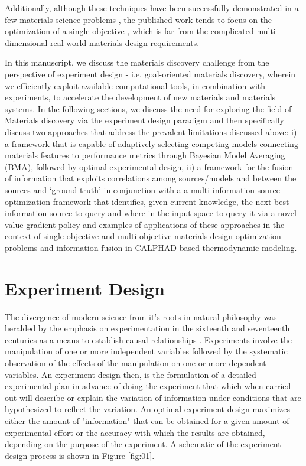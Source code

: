 \documentclass[utf8]{frontiersSCNS} %
\begin{document}
 Additionally, although these techniques have been successfully demonstrated in a few materials science problems \cite{MP1,MP2,MP3,MP4,MP5,MP6,MP7,MP8,MP9}, the published work tends to focus on the optimization of a single objective \cite{balachandran2016adaptive}, which is far from the complicated multi-dimensional real world materials design requirements.

In this manuscript, we discuss the materials discovery challenge from the perspective of experiment design - i.e. goal-oriented materials discovery, wherein we efficiently exploit available computational tools, in combination with experiments, to accelerate the development of new materials and materials systems. In the following sections, we discuss the need for exploring the field of Materials discovery via the experiment design paradigm and then  specifically discuss two approaches that address the prevalent limitations discussed above: i) a framework that is capable of adaptively selecting competing models connecting materials features to performance metrics through Bayesian Model Averaging (BMA), followed by optimal experimental design, ii) a framework for the fusion of information that exploits correlations among sources/models and between the sources and ‘ground truth’ in conjunction with a a multi-information source optimization framework that identifies, given current knowledge, the next best information source to query and where in the input space to query it via a novel value-gradient policy and examples of applications of these approaches in the context of single-objective and multi-objective materials design optimization problems  and information fusion in CALPHAD-based thermodynamic modeling. 

\section{Experiment Design}
 The divergence of modern science from it's roots in natural philosophy was heralded by the emphasis on experimentation in the sixteenth and seventeenth centuries as a means to establish causal relationships \cite{hacking1983representing}. Experiments involve the manipulation of one or more independent variables followed by the systematic observation of the effects of the manipulation on one or more dependent variables. An experiment design then, is the formulation of a detailed experimental plan in advance of doing the experiment that which when carried out will describe or explain the variation of information under conditions that are hypothesized to reflect the variation. An optimal experiment design maximizes either the amount of "information" that can be obtained for a given amount of experimental effort or the accuracy with which the results are obtained, depending on the purpose of the experiment. A schematic of the experiment design process is shown in Figure \ref{fig:01}.
\end{document}
